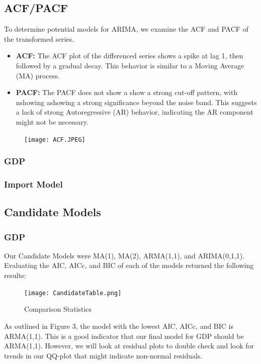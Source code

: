 \documentclass[11pt]{article}
\begin{document}
\subsection{ACF/PACF}
To determine potential models for ARIMA, we examine the ACF and PACF of the transformed series.

\begin{itemize}
    \item \textbf{ACF:} The ACF plot of the differenced series shows a spike at lag 1, then followed by a gradual decay. This behavior is similar to a Moving Average (MA) process.

    \item \textbf{PACF:} The PACF does not show a show a strong cut-off pattern, with nshowing ashowing a strong significance beyond the noise band. This suggests a lack of strong Autoregressive (AR) behavior, indicating the AR component might not be necessary.
\end{itemize}


\begin{figure}[h]
  \centering
  \texttt{[image: ACF.JPEG]}
\end{figure}

  \subsubsection{GDP}
  
  \subsubsection{Import Model}

\subsection{Candidate Models}
  \subsubsection{GDP}
Our Candidate Models were MA(1), MA(2), ARMA(1,1), and ARIMA(0,1,1). Evaluating the AIC, AICc, and BIC of each of the models returned the following results:
\begin{figure}
    \centering
    \texttt{[image: CandidateTable.png]}
    \caption{Comparison Statistics}
    \label{fig:aic}
\end{figure}
As outlined in Figure 3, the model with the lowest AIC, AICc, and BIC is ARMA(1,1). This is a good indicator that our final model for GDP should be ARMA(1,1). However, we will look at residual plots to double check and look for trends in our QQ-plot that might indicate non-normal residuals. 
\end{document}
